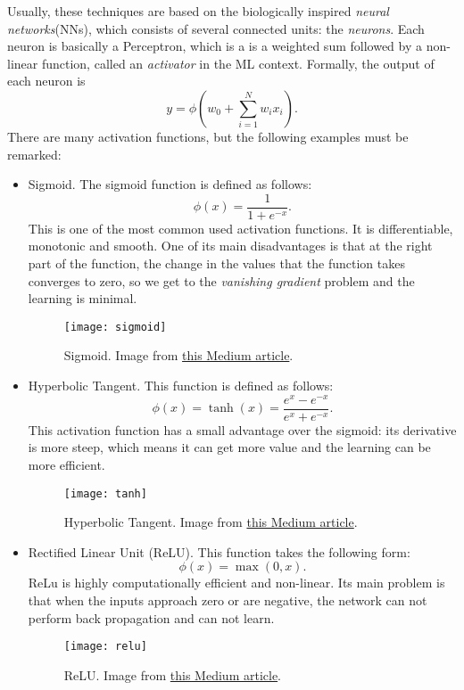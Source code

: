 Usually, these techniques are based on the biologically inspired \emph{neural networks}(NNs), which consists of several connected units: the \emph{neurons}. Each neuron is basically a Perceptron, which is a is a weighted sum followed by a non-linear function, called an \emph{activator} in the ML context. Formally, the output of each neuron is 
\[
y = \phi\left(w_0 +\sum_{i = 1}^N w_i x_i \right) .   
\]
There are many activation functions, but the following examples must be remarked:
\begin{itemize}
\item Sigmoid. The sigmoid function is defined as follows:
\[
\phi(x) = \frac{1}{1+ e^{-x}}.
\]
This is one of the most common used activation functions. It is differentiable, monotonic and smooth. One of its main disadvantages is that at the right part of the function, the change in the values that the function takes converges to zero, so we get to the \emph{vanishing gradient} problem and the learning is minimal.

\begin{figure}[H]
    \centering
    \texttt{[image: sigmoid]}
    \caption{Sigmoid. Image from \href{https://xzz201920.medium.com/activation-functions-linear-non-linear-in-deep-learning-relu-sigmoid-softmax-swish-leaky-relu-a6333be712ea}{this Medium article}. } \label{fig:sigmoid}
\end{figure}

\item Hyperbolic Tangent. This function is defined as follows:
\[
\phi(x) = \operatorname{tanh}(x) =  \frac{e^x - e^{-x}}{e^x + e^{-x}}.    
\]
This activation function has a small advantage over the sigmoid: its derivative is more steep, which means it can get more value and the learning can be more efficient.

\begin{figure}[H]
    \centering
    \texttt{[image: tanh]}
    \caption{Hyperbolic Tangent. Image from \href{https://xzz201920.medium.com/activation-functions-linear-non-linear-in-deep-learning-relu-sigmoid-softmax-swish-leaky-relu-a6333be712ea}{this Medium article}. } \label{fig:tanh}
\end{figure}

\item Rectified Linear Unit (ReLU). This function takes the following form:
\[
\phi(x) = \max\left(0,x\right).    
\]
ReLu is highly computationally efficient and non-linear. Its main problem is that when the inputs approach zero or are negative, the network can not perform back propagation and can not learn.

\begin{figure}[H]
    \centering
    \texttt{[image: relu]}
    \caption{ReLU. Image from \href{https://xzz201920.medium.com/activation-functions-linear-non-linear-in-deep-learning-relu-sigmoid-softmax-swish-leaky-relu-a6333be712ea}{this Medium article}. } \label{fig:relu}
\end{figure}
\end{itemize}



